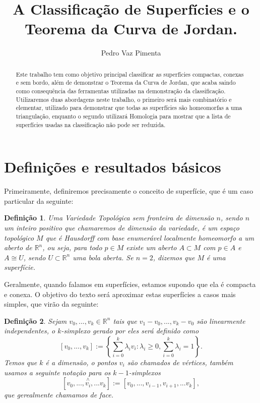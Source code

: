 \documentclass[12pt,a4paper]{article}
\title{A Classificação de Superfícies e o Teorema da Curva de Jordan.}
\author{Pedro Vaz Pimenta}
\newtheorem{mydef}{Definição}[section]
\theoremstyle{definition}
\begin{document}
\maketitle

\begin{abstract}
    Este trabalho tem como objetivo principal classificar as superfícies compactas, conexas e sem bordo, além de demonstrar o Teorema da Curva de Jordan, que acaba saindo como consequência das ferramentas utilizadas na demonstração da classificação. Utilizaremos duas abordagens neste trabalho, o primeiro será mais combinatório e elementar, utilizado para demonstrar que todas as superfícies são homeomorfas a uma triangulação, enquanto o segundo utilizará Homologia para mostrar que a lista de superfícies usadas na classificação não pode ser reduzida.   
\end{abstract}

\section{Definições e resultados básicos} 

Primeiramente, definiremos precisamente o conceito de superfície, que é um caso particular da seguinte:


\begin{mydef}

    Uma Variedade Topológica sem fronteira de dimensão $n$, sendo $n$ um inteiro positivo que chamaremos de dimensão da variedade, é um espaço topológico $M$ que é Hausdorff com base enumerável localmente homeomorfo a um aberto de $\mathbb{R}^n$, ou seja, para todo $p\in M$ existe um aberto $A\subset M$ com $p\in A$ e $A\cong U$, sendo $U\subset \mathbb{R}^n$ uma bola aberta. Se $n=2$, dizemos que $M$ é uma superfície. 

\end{mydef}

Geralmente, quando falamos em superfícies, estamos supondo que ela é compacta e conexa. O objetivo do texto será aproximar estas superfícies a casos mais simples, que virão da seguinte:

\begin{mydef}

    Sejam $v_0,...,v_k \in \mathbb{R}^n$ tais que $v_1-v_0,...,v_k-v_0$ são linearmente independentes, o $k$-simplexo gerado por eles será definido como $$[v_0,...,v_k] := \left\{\sum_{i=0}^k \lambda_i v_i : \lambda_i \geq 0, \sum_{i=0}^k \lambda_i = 1\right\}.$$ Temos que $k$ é a dimensão, o pontos $v_i$ são chamados de vértices, também usamos a seguinte notação para os $k-1$-simplexos $$[v_0,..., \overset{ \wedge}{v_i} , ... v_k] := [v_0,..., v_{i-1} , v_{i+1} , ... v_k],$$ que gerealmente chamamos de face.    

\end{mydef}
\end{document}
